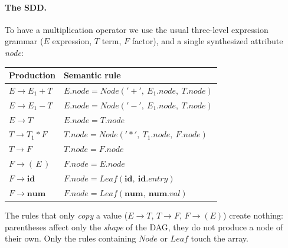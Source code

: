 \documentclass[11pt,a4paper]{article}
\newcommand{\at}[2]{\ensuremath{#1.\mathit{#2}}}
\newcommand{\tok}[1]{\ensuremath{\mathtt{#1}}}
\begin{document}
\paragraph{The SDD.} To have a multiplication operator we use the usual three-level expression grammar ($E$ expression, $T$ term, $F$ factor), and a single synthesized attribute \textit{node}:
\begin{center}
\small
\begin{tabular}{@{}l l@{}}
\toprule
\textbf{Production} & \textbf{Semantic rule} \\ \midrule
$E \to E_1 + T$ & $\at{E}{node} = \mathit{Node}(\tok{'+'},\ \at{E_1}{node},\ \at{T}{node})$ \\
$E \to E_1 - T$ & $\at{E}{node} = \mathit{Node}(\tok{'-'},\ \at{E_1}{node},\ \at{T}{node})$ \\
$E \to T$ & $\at{E}{node} = \at{T}{node}$ \\
$T \to T_1 * F$ & $\at{T}{node} = \mathit{Node}(\tok{'*'},\ \at{T_1}{node},\ \at{F}{node})$ \\
$T \to F$ & $\at{T}{node} = \at{F}{node}$ \\
$F \to (\,E\,)$ & $\at{F}{node} = \at{E}{node}$ \\
$F \to \mathbf{id}$ & $\at{F}{node} = \mathit{Leaf}(\mathbf{id},\ \at{\mathbf{id}}{entry})$ \\
$F \to \mathbf{num}$ & $\at{F}{node} = \mathit{Leaf}(\mathbf{num},\ \at{\mathbf{num}}{val})$ \\ \bottomrule
\end{tabular}
\end{center}
The rules that only \emph{copy} a value ($E\to T$, $T\to F$, $F\to(E)$) create nothing: parentheses affect only the \emph{shape} of the DAG, they do not produce a node of their own. Only the rules containing $\mathit{Node}$ or $\mathit{Leaf}$ touch the array.
\end{document}
